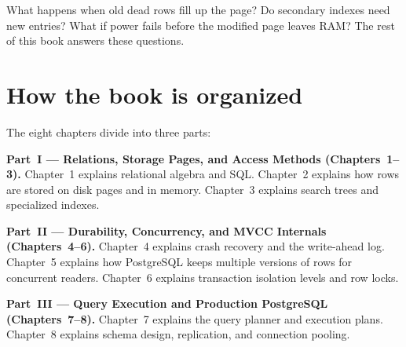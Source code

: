 What happens when old dead rows fill up the page? Do secondary indexes need new entries? What if power fails before the modified page leaves RAM? The rest of this book answers these questions.

\section*{How the book is organized}

The eight chapters divide into three parts:

\textbf{Part~I --- Relations, Storage Pages, and Access Methods (Chapters~1--3).} Chapter~1 explains relational algebra and SQL. Chapter~2 explains how rows are stored on disk pages and in memory. Chapter~3 explains search trees and specialized indexes.

\textbf{Part~II --- Durability, Concurrency, and MVCC Internals (Chapters~4--6).} Chapter~4 explains crash recovery and the write-ahead log. Chapter~5 explains how PostgreSQL keeps multiple versions of rows for concurrent readers. Chapter~6 explains transaction isolation levels and row locks.

\textbf{Part~III --- Query Execution and Production PostgreSQL (Chapters~7--8).} Chapter~7 explains the query planner and execution plans. Chapter~8 explains schema design, replication, and connection pooling.

\begin{center}
\end{center}

